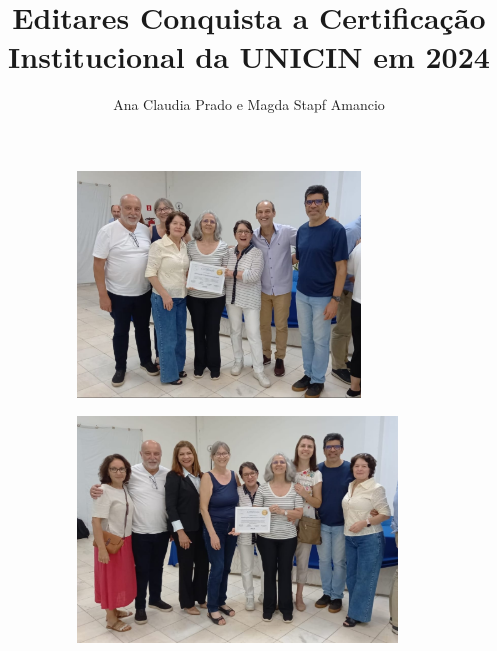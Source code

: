 \documentclass{gescons}
\author{Ana Claudia Prado e Magda Stapf Amancio}
\title{Editares Conquista a Certificação Institucional da UNICIN em 2024}
\begin{document}
    \makeentrevistatitle


    




\begin{figure}[h]
  \centering
  \begin{subfigure}[b]{0.49\textwidth}
    \includegraphics[height=60mm,keepaspectratio]{articles/resumo/fotos/materia3/d94f6571-cf63-48d2-976b-507cbf8cafc5.jpg}
\end{subfigure}
\begin{subfigure}[b]{0.49\textwidth}
    \includegraphics[height=60mm,keepaspectratio]{articles/resumo/fotos/materia3/06eb15bb-01a3-43d5-84e2-67f62c13a53e.jpg}
  \end{subfigure}
\end{figure}
\end{document}
